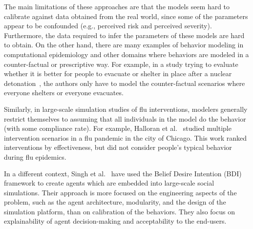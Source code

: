 \documentclass[doublespace]{VTthesis}
\begin{document}
	The main limitations of these approaches are that the models seem hard to calibrate against data obtained from the real world, since some of the parameters appear to be confounded (e.g., perceived risk and perceived severity). Furthermore, the data required to infer the parameters of these models are hard to obtain. On the other hand, there are many examples of behavior modeling in computational epidemiology and other domains where behaviors are modeled in a counter-factual or prescriptive way. For example, in a study trying to evaluate whether it is better for people to evacuate or shelter in place after a nuclear detonation~\cite{wein10nuclear,parikh16jaamas}, the authors only have to model the counter-factual scenarios where everyone shelters or everyone evacuates.
	
	Similarly, in large-scale simulation studies of flu interventions, modelers generally restrict themselves to assuming that all individuals in the model do the behavior (with some compliance rate). For example, Halloran et al.~\cite{halloran08modeling} studied multiple intervention scenarios in a flu pandemic in the city of Chicago. This work ranked interventions by effectiveness, but did not consider people's typical behavior during flu epidemics.
    
    In a different context, Singh et al.~\cite{singh16bdi} have used the Belief Desire Intention (BDI) framework to create agents which are embedded into large-scale social simulations. Their approach is more focused on the engineering aspects of the problem, such as the agent architecture, modularity, and the design of the simulation platform, than on calibration of the behaviors. They also focus on explainability of agent decision-making and acceptability to the end-users. 
    
\end{document}
